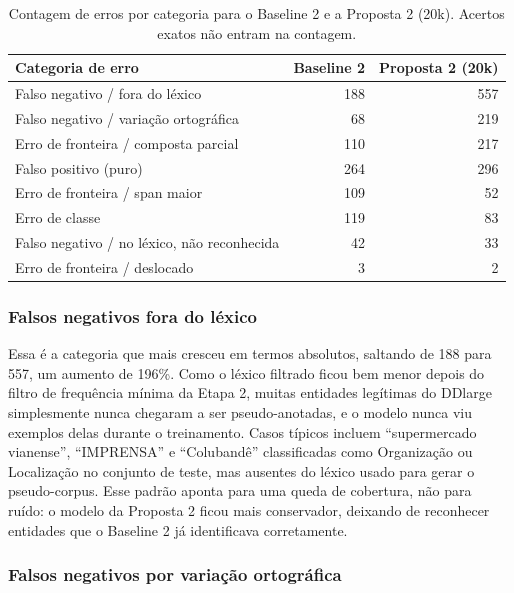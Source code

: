 \documentclass[12pt,a4paper]{article}
\begin{document}
\begin{table}[H]
\centering
\caption{Contagem de erros por categoria para o Baseline 2 e a Proposta 2 (20k).
Acertos exatos não entram na contagem.}
\label{tab:erros}
\small
\begin{tabular}{lrr}
\toprule
\textbf{Categoria de erro} & \textbf{Baseline 2} & \textbf{Proposta 2 (20k)} \\
\midrule
Falso negativo / fora do léxico              & 188 & 557 \\
Falso negativo / variação ortográfica        &  68 & 219 \\
Erro de fronteira / composta parcial         & 110 & 217 \\
Falso positivo (puro)                        & 264 & 296 \\
Erro de fronteira / span maior               & 109 &  52 \\
Erro de classe                               & 119 &  83 \\
Falso negativo / no léxico, não reconhecida  &  42 &  33 \\
Erro de fronteira / deslocado                &   3 &   2 \\
\bottomrule
\end{tabular}
\end{table}

\subsubsection{Falsos negativos fora do léxico}

Essa é a categoria que mais cresceu em termos absolutos, saltando de 188 para
557, um aumento de 196\%. Como o léxico filtrado ficou bem menor depois do
filtro de frequência mínima da Etapa 2, muitas entidades legítimas do DDlarge
simplesmente nunca chegaram a ser pseudo-anotadas, e o modelo nunca viu
exemplos delas durante o treinamento. Casos típicos incluem ``supermercado
vianense'', ``IMPRENSA'' e ``Colubandê'' classificadas como Organização ou
Localização no conjunto de teste, mas ausentes do léxico usado para gerar o
pseudo-corpus. Esse padrão aponta para uma queda de cobertura, não para ruído:
o modelo da Proposta 2 ficou mais conservador, deixando de reconhecer
entidades que o Baseline 2 já identificava corretamente.

\subsubsection{Falsos negativos por variação ortográfica}
\end{document}
